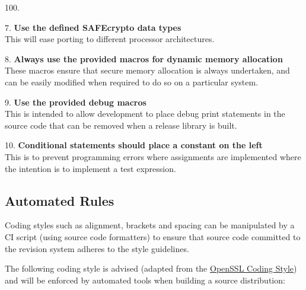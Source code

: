 \begin{labeling}{100.}
\item [7.] \textbf{Use the defined SAFEcrypto data types} \\
   This will ease porting to different processor architectures. \\
\item [8.] \textbf{Always use the provided macros for dynamic memory allocation} \\
   These macros ensure that secure memory allocation is always undertaken, and can be easily modified when required to do so on a particular system. \\
\item [9.] \textbf{Use the provided debug macros} \\
   This is intended to allow development to place debug print statements in the
   source code that can be removed when a release library is built. \\
\item [10.] \textbf{Conditional statements should place a constant on the left} \\
   This is to prevent programming errors where assignments are implemented where the intention is to implement a test expression.
\end{labeling}


\subsection{Automated Rules}
Coding styles such as alignment, brackets and spacing can be manipulated by a CI script (using source code formatters) to ensure that source code committed to the revision system adheres to the style guidelines.

The following coding style is advised (adapted from the \href{https://www.openssl.org/policies/codingstyle.html}{OpenSSL Coding Style}) and will be enforced by automated tools when building a source distribution:

